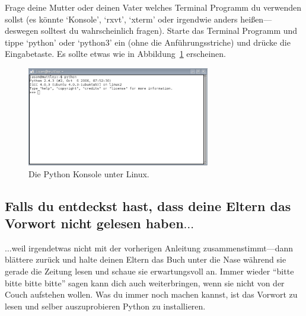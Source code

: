 \begin{LINUX}
Frage deine Mutter oder deinen Vater welches Terminal Programm du verwenden sollst (es könnte `Konsole', `rxvt', `xterm' oder irgendwie anders heißen---deswegen solltest du wahrscheinlich fragen). Starte das Terminal Programm und tippe `python' oder `python3' ein (ohne die Anführungsstriche) und drücke die Eingabetaste. Es sollte etwas wie in Abbildung~\ref{fig4} erscheinen.

\begin{figure}
\begin{center}
\includegraphics[width=80mm]{images/figure4}
\end{center}
\caption{Die Python Konsole unter Linux.}\label{fig4}
\end{figure}
\end{LINUX}

\subsection*{\color{BrickRed}Falls du entdeckst hast, dass deine Eltern das Vorwort nicht gelesen haben$\ldots$}

$\ldots$weil irgendetwas nicht mit der vorherigen Anleitung zusammenstimmt---dann blättere zurück und halte deinen Eltern das Buch unter die Nase während sie gerade die Zeitung lesen und schaue sie erwartungsvoll an. Immer wieder ``bitte bitte bitte bitte'' sagen kann dich auch weiterbringen, wenn sie nicht von der Couch aufstehen wollen. Was du immer noch machen kannst, ist das Vorwort zu lesen und selber auszuprobieren Python zu installieren.

